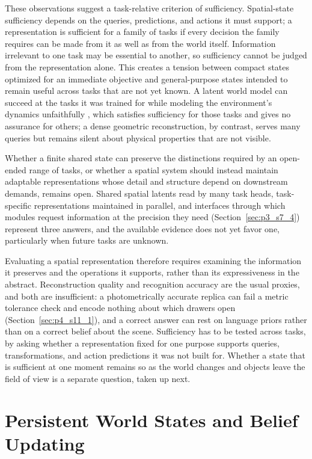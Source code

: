 These observations suggest a task-relative criterion of sufficiency.
Spatial-state sufficiency depends on the queries, predictions, and actions it must support; a representation is sufficient for a family of tasks if every decision the family requires can be made from it as well as from the world itself.
Information irrelevant to one task may be essential to another, so sufficiency cannot be judged from the representation alone.
This creates a tension between compact states optimized for an immediate objective and general-purpose states intended to remain useful across tasks that are not yet known.
A latent world model can succeed at the tasks it was trained for while modeling the environment's dynamics unfaithfully \cite{gonzalezlaiz2026limits}, which satisfies sufficiency for those tasks and gives no assurance for others; a dense geometric reconstruction, by contrast, serves many queries but remains silent about physical properties that are not visible.

Whether a finite shared state can preserve the distinctions required by an open-ended range of tasks, or whether a spatial system should instead maintain adaptable representations whose detail and structure depend on downstream demands, remains open.
Shared spatial latents read by many task heads, task-specific representations maintained in parallel, and interfaces through which modules request information at the precision they need (Section~\ref{sec:p3_s7_4}) represent three answers, and the available evidence does not yet favor one, particularly when future tasks are unknown.

Evaluating a spatial representation therefore requires examining the information it preserves and the operations it supports, rather than its expressiveness in the abstract.
Reconstruction quality and recognition accuracy are the usual proxies, and both are insufficient: a photometrically accurate replica can fail a metric tolerance check and encode nothing about which drawers open (Section~\ref{sec:p4_s11_1}), and a correct answer can rest on language priors rather than on a correct belief about the scene.
Sufficiency has to be tested across tasks, by asking whether a representation fixed for one purpose supports queries, transformations, and action predictions it was not built for.
Whether a state that is sufficient at one moment remains so as the world changes and objects leave the field of view is a separate question, taken up next.


\section{Persistent World States and Belief Updating}
\label{sec:p5_persistence}
\label{sec:p5_worldstate}

